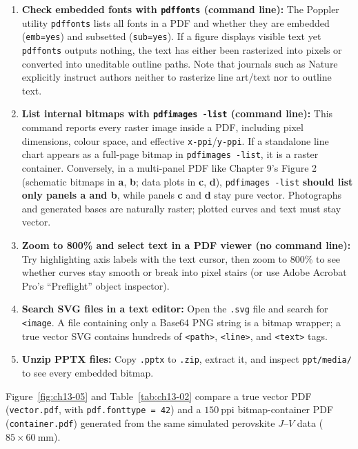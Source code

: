 \begin{enumerate}
\item \textbf{Check embedded fonts with \texttt{pdffonts} (command line):} The Poppler utility \texttt{pdffonts} lists all fonts in a PDF and whether they are embedded (\texttt{emb=yes}) and subsetted (\texttt{sub=yes}). If a figure displays visible text yet \texttt{pdffonts} outputs nothing, the text has either been rasterized into pixels or converted into uneditable outline paths. Note that journals such as Nature explicitly instruct authors neither to rasterize line art/text nor to outline text.
\item \textbf{List internal bitmaps with \texttt{pdfimages -list} (command line):} This command reports every raster image inside a PDF, including pixel dimensions, colour space, and effective \texttt{x-ppi}/\texttt{y-ppi}. If a standalone line chart appears as a full-page bitmap in \texttt{pdfimages -list}, it is a raster container. Conversely, in a multi-panel PDF like Chapter 9's Figure 2 (schematic bitmaps in \textbf{a}, \textbf{b}; data plots in \textbf{c}, \textbf{d}), \texttt{pdfimages -list} \textbf{should list only panels a and b}, while panels \textbf{c} and \textbf{d} stay pure vector. Photographs and generated bases are naturally raster; plotted curves and text must stay vector.
\item \textbf{Zoom to 800\% and select text in a PDF viewer (no command line):} Try highlighting axis labels with the text cursor, then zoom to $800\%$ to see whether curves stay smooth or break into pixel stairs (or use Adobe Acrobat Pro's ``Preflight'' object inspector).
\item \textbf{Search SVG files in a text editor:} Open the \texttt{.svg} file and search for \texttt{<image}. A file containing only a Base64 PNG string is a bitmap wrapper; a true vector SVG contains hundreds of \texttt{<path>}, \texttt{<line>}, and \texttt{<text>} tags.
\item \textbf{Unzip PPTX files:} Copy \texttt{.pptx} to \texttt{.zip}, extract it, and inspect \texttt{ppt/media/} to see every embedded bitmap.
\end{enumerate}

Figure~\ref{fig:ch13-05} and Table~\ref{tab:ch13-02} compare a true vector PDF (\texttt{vector.pdf}, with \texttt{pdf.fonttype = 42}) and a $150\ \text{ppi}$ bitmap-container PDF (\texttt{container.pdf}) generated from the same simulated perovskite $J\text{--}V$ data\allowbreak{} ($85 \times 60\ \text{mm}$).

